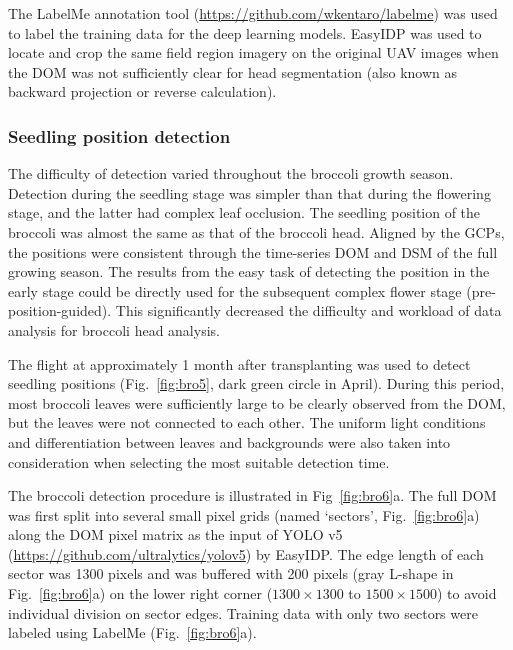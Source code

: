 

The LabelMe annotation tool (\url{https://github.com/wkentaro/labelme}) was used to label the training data for the deep learning models. EasyIDP \citep[\url{https://github.com/UTokyo-FieldPhenomics-Lab/EasyIDP}]{wang_easyidp_2021} was used to locate and crop the same field region imagery on the original UAV images when the DOM was not sufficiently clear for head segmentation (also known as backward projection or reverse calculation).

\subsubsection*{Seedling position detection}

The difficulty of detection varied throughout the broccoli growth season. Detection during the seedling stage was simpler than that during the flowering stage, and the latter had complex leaf occlusion. The seedling position of the broccoli was almost the same as that of the broccoli head. Aligned by the GCPs, the positions were consistent through the time-series DOM and DSM of the full growing season. The results from the easy task of detecting the position in the early stage could be directly used for the subsequent complex flower stage (pre-position-guided). This significantly decreased the difficulty and workload of data analysis for broccoli head analysis.

The flight at approximately 1 month after transplanting was used to detect seedling positions (Fig.~\ref{fig:bro5}, dark green circle in April). During this period, most broccoli leaves were sufficiently large to be clearly observed from the DOM, but the leaves were not connected to each other. The uniform light conditions and differentiation between leaves and backgrounds were also taken into consideration when selecting the most suitable detection time.

The broccoli detection procedure is illustrated in Fig~\ref{fig:bro6}a. The full DOM was first split into several small pixel grids (named `sectors', Fig.~\ref{fig:bro6}a) along the DOM pixel matrix as the input of YOLO v5 (\url{https://github.com/ultralytics/yolov5}) by EasyIDP. The edge length of each sector was 1300 pixels and was buffered with 200 pixels (gray L-shape in Fig.~\ref{fig:bro6}a) on the lower right corner ($1300 \times 1300$ to $1500 \times 1500$) to avoid individual division on sector edges. Training data with only two sectors were labeled using LabelMe (Fig.~\ref{fig:bro6}a). 

